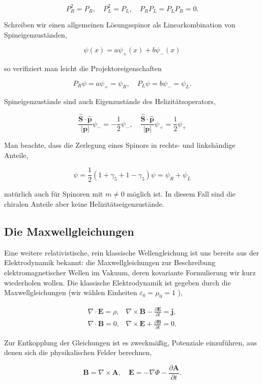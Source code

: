\documentclass[10pt, letterpaper]{article}
\begin{document}
$$
P_{R}^{2}=P_{R}, \quad P_{L}^{2}=P_{L}, \quad P_{R} P_{L}=P_{L} P_{R}=0 .
$$

Schreiben wir einen allgemeinen Lösungsspinor als Linearkombination von Spineigenzuständen,

$$
\psi(x)=a \psi_{+}(x)+b \psi_{-}(x)
$$

so verifiziert man leicht die Projektoreigenschaften

$$
P_{R} \psi=a \psi_{+}=\psi_{R}, \quad P_{L} \psi=b \psi_{-}=\psi_{L} .
$$

Spineigenzustände sind auch Eigenzustände des Helizitätsoperators,

$$
\frac{\hat{\mathbf{S}} \cdot \hat{\mathbf{p}}}{|\mathbf{p}|} \psi_{-}=-\frac{1}{2} \psi_{-}, \quad \frac{\hat{\mathbf{S}} \cdot \hat{\mathbf{p}}}{|\mathbf{p}|} \psi_{+}=\frac{1}{2} \psi_{+}
$$

Man beachte, dass die Zerlegung eines Spinors in rechts- und linkshändige Anteile,

$$
\psi=\frac{1}{2}\left(1+\gamma_{5}+1-\gamma_{5}\right) \psi=\psi_{R}+\psi_{L}
$$

natürlich auch für Spinoren mit $m \neq 0$ möglich ist. In diesem Fall sind die chiralen Anteile aber keine Helizitätseigenzustände.


\pagebreak

\subsection{Die Maxwellgleichungen}

Eine weitere relativistische, rein klassische Wellengleichung ist uns bereits aus der Elektrodynamik bekannt: die Maxwellgleichungen zur Beschreibung elektromagnetischer Wellen im Vakuum, deren kovariante Formulierung wir kurz wiederholen wollen. Die klassische Elektrodynamik ist gegeben durch die Maxwellgleichungen (wir wählen Einheiten $\varepsilon_{0}=\mu_{0}=1$ ),

$$
\begin{array}{ll}
\nabla \cdot \mathbf{E}=\rho, & \nabla \times \mathbf{B}-\frac{\partial \mathbf{E}}{\partial t}=\mathbf{j}, \\
\nabla \cdot \mathbf{B}=0, & \nabla \times \mathbf{E}+\frac{\partial \mathbf{B}}{\partial t}=0 .
\end{array}
$$

Zur Entkopplung der Gleichungen ist es zweckmäßig, Potenziale einzuführen, aus denen sich die physikalischen Felder berechnen,

$$
\mathbf{B}=\nabla \times \mathbf{A}, \quad \mathbf{E}=-\nabla \Phi-\frac{\partial \mathbf{A}}{\partial t} .
$$
\end{document}
